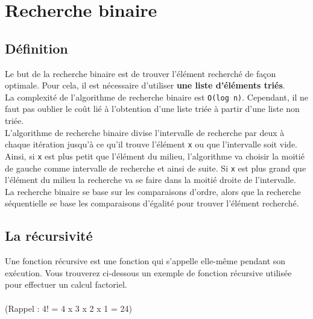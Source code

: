     
    \newpage
    \section{Recherche binaire}
    
    \subsection{Définition}
    
    Le but de la recherche binaire est de trouver l'élément recherché de façon optimale. Pour cela, il est nécessaire d'utiliser \textbf{une liste d'éléments triés}.\\
    
    La complexité de l'algorithme de recherche binaire est \lstinline{O(log n)}. Cependant, il ne faut pas oublier le coût lié à l'obtention d'une liste triée à partir d'une liste non triée.\\
    
    L'algorithme de recherche binaire divise l'intervalle de recherche par deux à chaque itération jusqu'à ce qu'il trouve l'élément \lstinline{x} ou que l'intervalle soit vide.\\
    
    Ainsi, si \lstinline{x} est plus petit que l'élément du milieu, l'algorithme va choisir la moitié de gauche comme intervalle de recherche et ainsi de suite. Si \lstinline{x} est plus grand que l'élément du milieu la recherche va se faire dans la moitié droite de l'intervalle.\\
    
    La recherche binaire se base sur les comparaisons d'ordre, alors que la recherche séquentielle se base les comparaisons d'égalité pour trouver l'élément recherché.\\
    
    \subsection{La récursivité}
    
    Une fonction récursive est une fonction qui s'appelle elle-même pendant son exécution. Vous trouverez ci-dessous un exemple de fonction récursive utilisée pour effectuer un calcul factoriel.\\\\
    (Rappel : 4! = 4 x 3 x 2 x 1 = 24)\\
    
    
    
